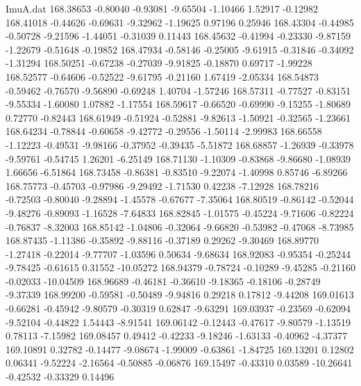 \begin{filecontents}{ImuA.dat}
 168.38653   -0.80040   -0.93081   -9.65504   -1.10466    1.52917   -0.12982
 168.41018   -0.44626   -0.69631   -9.32962   -1.19625    0.97196    0.25946
 168.43304   -0.44985   -0.50728   -9.21596   -1.44051   -0.31039    0.11443
 168.45632   -0.41994   -0.23330   -9.87159   -1.22679   -0.51648   -0.19852
 168.47934   -0.58146   -0.25005   -9.61915   -0.31846   -0.34092   -1.31294
 168.50251   -0.67238   -0.27039   -9.91825   -0.18870    0.69717   -1.99228
 168.52577   -0.64606   -0.52522   -9.61795   -0.21160    1.67419   -2.05334
 168.54873   -0.59462   -0.76570   -9.56890   -0.69248    1.40704   -1.57246
 168.57311   -0.77527   -0.83151   -9.55334   -1.60080    1.07882   -1.17554
 168.59617   -0.66520   -0.69990   -9.15255   -1.80689    0.72770   -0.82443
 168.61949   -0.51924   -0.52881   -9.82613   -1.50921   -0.32565   -1.23661
 168.64234   -0.78844   -0.60658   -9.42772   -0.29556   -1.50114   -2.99983
 168.66558   -1.12223   -0.49531   -9.98166   -0.37952   -0.39435   -5.51872
 168.68857   -1.26939   -0.33978   -9.59761   -0.54745    1.26201   -6.25149
 168.71130   -1.10309   -0.83868   -9.86680   -1.08939    1.66656   -6.51864
 168.73458   -0.86381   -0.83510   -9.22074   -1.40998    0.85746   -6.89266
 168.75773   -0.45703   -0.97986   -9.29492   -1.71530    0.42238   -7.12928
 168.78216   -0.72503   -0.80040   -9.28894   -1.45578   -0.67677   -7.35064
 168.80519   -0.86142   -0.52044   -9.48276   -0.89093   -1.16528   -7.64833
 168.82845   -1.01575   -0.45224   -9.71606   -0.82224   -0.76837   -8.32003
 168.85142   -1.04806   -0.32064   -9.66820   -0.53982   -0.47068   -8.73985
 168.87435   -1.11386   -0.35892   -9.88116   -0.37189    0.29262   -9.30469
 168.89770   -1.27418   -0.22014   -9.77707   -1.03596    0.50634   -9.68634
 168.92083   -0.95354   -0.25244   -9.78425   -0.61615    0.31552  -10.05272
 168.94379   -0.78724   -0.10289   -9.45285   -0.21160   -0.02033  -10.04509
 168.96689   -0.46181   -0.36610   -9.18365   -0.18106   -0.28749   -9.37339
 168.99200   -0.59581   -0.50489   -9.94816    0.29218    0.17812   -9.44208
 169.01613   -0.66281   -0.45942   -9.80579   -0.30319    0.62847   -9.63291
 169.03937   -0.23569   -0.62094   -9.52104   -0.44822    1.54443   -8.91541
 169.06142   -0.12443   -0.47617   -9.80579   -1.13519    0.78113   -7.15982
 169.08457    0.49412   -0.42233   -9.18246   -1.63133   -0.40962   -4.37377
 169.10891    0.32782   -0.14477   -9.08674   -1.99009   -0.63861   -1.84725
 169.13201    0.12802    0.06341   -9.52224   -2.16564   -0.50885   -0.06876
 169.15497   -0.43310    0.03589  -10.26641   -0.42532   -0.33329    0.14496

\end{filecontents}
